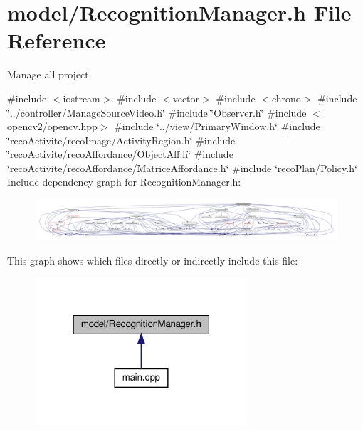 \section{model/\+Recognition\+Manager.h File Reference}
\label{_recognition_manager_8h}


Manage all project.  


{\ttfamily \#include $<$iostream$>$}\newline
{\ttfamily \#include $<$vector$>$}\newline
{\ttfamily \#include $<$chrono$>$}\newline
{\ttfamily \#include \char`\"{}../controller/\+Manage\+Source\+Video.\+h\char`\"{}}\newline
{\ttfamily \#include \char`\"{}Observer.\+h\char`\"{}}\newline
{\ttfamily \#include $<$opencv2/opencv.\+hpp$>$}\newline
{\ttfamily \#include \char`\"{}../view/\+Primary\+Window.\+h\char`\"{}}\newline
{\ttfamily \#include \char`\"{}reco\+Activite/reco\+Image/\+Activity\+Region.\+h\char`\"{}}\newline
{\ttfamily \#include \char`\"{}reco\+Activite/reco\+Affordance/\+Object\+Aff.\+h\char`\"{}}\newline
{\ttfamily \#include \char`\"{}reco\+Activite/reco\+Affordance/\+Matrice\+Affordance.\+h\char`\"{}}\newline
{\ttfamily \#include \char`\"{}reco\+Plan/\+Policy.\+h\char`\"{}}\newline
Include dependency graph for Recognition\+Manager.\+h\+:
\nopagebreak
\begin{figure}[H]
\begin{center}
\leavevmode
\includegraphics[width=350pt]{_recognition_manager_8h__incl}
\end{center}
\end{figure}
This graph shows which files directly or indirectly include this file\+:
\nopagebreak
\begin{figure}[H]
\begin{center}
\leavevmode
\includegraphics[width=223pt]{_recognition_manager_8h__dep__incl}
\end{center}
\end{figure}
